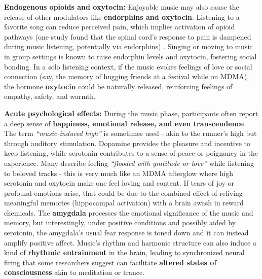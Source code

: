\documentclass[11pt]{article}
\newcommand{\quotes}[1]{``#1''}
\begin{document}
\textbf{Endogenous opioids and oxytocin:} Enjoyable music may also cause the release of other modulators like \textbf{endorphins and oxytocin}. Listening to a favorite song can reduce perceived pain, which implies activation of opioid pathways (one study found that the spinal cord's response to pain is dampened during music listening, potentially via endorphins) \cite{brainMuriel}. Singing or moving to music in group settings is known to raise endorphin levels and oxytocin, fostering social bonding. In a solo listening context, if the music evokes feelings of love or social connection (say, the memory of hugging friends at a festival while on MDMA), the hormone \textbf{oxytocin} could be naturally released, reinforcing feelings of empathy, safety, and warmth.

\textbf{Acute psychological effects:} During the music phase, participants often report a deep sense of \textbf{happiness, emotional release, and even transcendence}. The term \textit{\quotes{music-induced high}} is sometimes used - akin to the runner's high but through auditory stimulation. Dopamine provides the pleasure and incentive to keep listening, while serotonin contributes to a sense of peace or poignancy in the experience. Many describe feeling \textit{\quotes{flooded with gratitude or love}} while listening to beloved tracks - this is very much like an MDMA afterglow where high serotonin and oxytocin make one feel loving and content. If tears of joy or profound emotions arise, that could be due to the combined effect of reliving meaningful memories (hippocampal activation) with a brain awash in reward chemicals. The \textbf{amygdala} processes the emotional significance of the music and memory, but interestingly, under positive conditions and possibly aided by serotonin, the amygdala's usual fear response is toned down and it can instead amplify positive affect. Music's rhythm and harmonic structure can also induce a kind of \textbf{rhythmic entrainment} in the brain, leading to synchronized neural firing that some researchers suggest can facilitate \textbf{altered states of consciousness} akin to meditation or trance.
\end{document}
